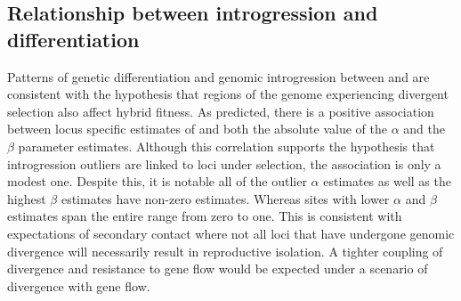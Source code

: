 






\subsection{Relationship between introgression and differentiation}
Patterns of genetic differentiation and genomic introgression between
\amer and \terr are consistent with the hypothesis that regions of the genome
experiencing divergent selection also affect hybrid fitness.
As predicted, there is a positive association between locus specific estimates
of \fst and both the absolute value of the $\alpha$ and the $\beta$ parameter 
estimates.
Although this correlation supports the hypothesis that introgression outliers 
are linked to loci under selection, the association is only a modest one. 
Despite this, it is notable all of the outlier $\alpha$ estimates as well as the
highest $\beta$ estimates have non-zero \fst estimates. 
Whereas sites with lower $\alpha$ and $\beta$ estimates span the entire range 
from zero to one. 
This is consistent with expectations of secondary contact where not all loci 
that have undergone genomic divergence will necessarily result in 
reproductive isolation. 
A tighter coupling of divergence and resistance to gene flow would be expected
under a scenario of divergence with gene flow. 

